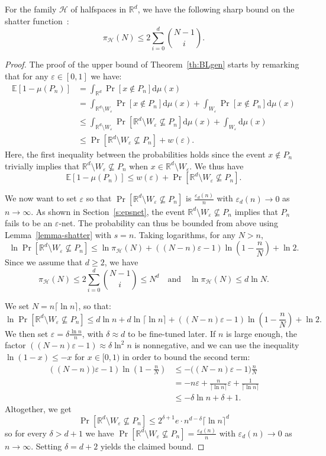 \documentclass[AHL,Unicode,longabstracts]{cedram}
\newcommand*{\dd}{\mathrm{d}}
\newcommand{\eps}{\varepsilon}
\newcommand{\Rbb}{\mathbb{R}}%
\newcommand{\Ebb}{\mathbb{E}}%
\newcommand{\Hcal}{\mathcal{H}} %
\newcommand{\pth}[1]{\left(#1 \right)}
\newcommand{\ptb}[1]{\left[#1 \right]}
\newcommand*{\mtfrac}[2]{\frac{#1}{#2}}%
\begin{document}
For the family $\Hcal$ of halfspaces in $\Rbb^d$, we have the following sharp bound on the shatter function~\cite{Harding}:
\[
\pi_{\Hcal}(N)\le 2\sum_{i=0}^{d} \binom{N-1}i.
\]
\begin{proof}
The proof of the upper bound of Theorem~\ref{th:BLgen} starts by remarking that for any $\eps \in [0,1]$ we have:
\begin{align*}
\Ebb\ptb{1-\mu(P_n)} & = \int_{\Rbb^d} \Pr[x \notin P_{n}]\dd\mu(x)\\
& = \int_{\Rbb^d \setminus W_\eps} \Pr[x \notin P_{n}]\dd\mu(x) + \int_{W_\eps} \Pr[x \notin P_{n}]\dd\mu(x) \\
& \le \int_{\Rbb^d \setminus W_\eps} \Pr[\Rbb^d \setminus W_\eps \not\subseteq P_{n}]\dd\mu(x) + \int_{W_\eps}\dd\mu(x)\\
& \le \Pr[\Rbb^d \setminus W_\eps \not\subseteq P_{n}] + w(\eps).
\end{align*}
Here, the first inequality between the probabilities holds since the event $x \notin P_{n}$ trivially implies that $\Rbb^d \setminus W_\eps \not\subseteq P_{n}$ when $x\in \Rbb^d \setminus W_\eps$. We thus have
\[
\Ebb\ptb{1-\mu(P_n)} \le w(\eps) + \Pr[\Rbb^d \setminus W_\eps \not\subseteq P_{n}].
\]

We now want to set $\eps$ so that $\Pr[\Rbb^d \setminus W_\eps \not\subseteq P_{n}]$ is $\frac{\eps_d(n)}{n}$ with $\eps_d(n) \to 0$ as $n \to \infty$. As shown in Section~\ref{s:epsnet}, the event $\Rbb^d \setminus W_\eps \not\subseteq P_{n}$ implies that $P_{n}$ fails to be an $\eps$-net. The probability can thus be bounded from above using Lemma~\ref{lemma-shatter} with $s=n$. Taking logarithms, for any $N > n$,
\[
\ln \Pr[\Rbb^d \setminus W_\eps \not\subseteq P_{n}] \le \ln
\pi_{\Hcal}(N) + \pth{(N-n)\eps-1}
\ln \left(1-\mtfrac{n}{N}\right) + \ln 2.
\]
Since we assume that $d\ge 2$, we have
\[
\pi_{\Hcal}(N) \le 2\sum_{i=0}^{d} \binom{N-1}i\le N^d \quad \text{and} \quad \ln\pi_{\Hcal}(N) \le d \ln N.
\]

We set $N = n \lceil \ln n \rceil$, so that:
\[
\ln \Pr[\Rbb^d \setminus W_\eps \not\subseteq P_{n}]\le d \ln n + d\ln \lceil \ln n \rceil+\pth{(N-n)\eps-1}\ln \left(1-\mtfrac{n}{N}\right) + \ln 2.
\]
We then set $\eps = \delta \frac{\ln n}{n}$, with $\delta \approx d$ to be fine-tuned later. If $n$ is large enough, the factor $\pth{{(N-n)\eps-1}}\approx \delta\ln^2 n$ is nonnegative, and we can use the inequality $\ln(1-x) \le -x$ for $x \in [0,1)$ in order to bound the second term:
\begin{align*}
\pth{(N-n))\eps-1} \ln \left(1-\mtfrac{n}{N}\right) &\le- \bigl({(N-n)\eps-1}\bigr)\frac{n}{N}\\
& = -n\eps +\frac{n}{\lceil \ln n \rceil}\eps +\frac1{\lceil \ln n
\rceil} \\
&\le - \delta \ln n +\delta + 1.
\end{align*}
Altogether, we get
\[
\Pr[\Rbb^d \setminus W_\eps \not\subseteq P_{n}] \le 2^{\delta+1}e \cdot n^{d-\delta}\lceil \ln n \rceil^d
\]
so for every $\delta > d+1$ we have $\Pr[\Rbb^d \setminus W_\eps \not\subseteq P_{n}] = \frac{\eps_d(n)}{n}$ with $\eps_d(n) \to 0$ as $n \to \infty$. Setting $\delta=d+2$ yields the claimed bound.
\end{proof}
\end{document}
